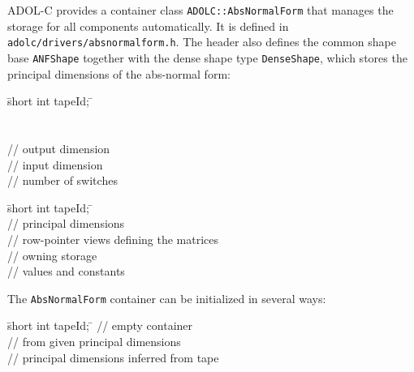 ADOL-C provides a container class \texttt{ADOLC::AbsNormalForm} that manages the storage for all components
automatically. It is defined in \texttt{adolc/drivers/absnormalform.h}. The
header also defines the common shape base \texttt{ANFShape} together with the
dense shape type \texttt{DenseShape}, which stores the principal dimensions of
the abs-normal form:
\begin{tabbing}
\hspace{0.2in}\={\sf short int tapeId;} \hspace{3.4in}\= \kill    %
 \\
\>{\sf \};} \\
 \\
 \> // output dimension \\
 \> // input dimension \\
 \> // number of switches \\
\>{\sf \};}
\end{tabbing}
\begin{tabbing}
\hspace{0.2in}\={\sf short int tapeId;} \hspace{3.4in}\= \kill    %
 \\
 \> // principal dimensions \\
 \> // row-pointer views defining the matrices \\
 \> // owning storage\\
 \> // values and constants \\
\>{\sf \};}
\end{tabbing}

The \texttt{AbsNormalForm} container can be initialized in several ways:
\begin{tabbing}
\hspace{0.4in}\={\sf short int tapeId;} \hspace{3.3in}\= \kill    %
 \> // empty container \\
 \> // from given principal dimensions \\
 \> // principal dimensions inferred from tape
\end{tabbing}

